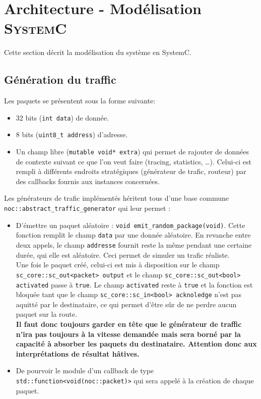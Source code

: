 \section{Architecture - Modélisation \textsc{SystemC}}

Cette section décrit la modélisation du système en SystemC.

\subsection{Génération du traffic}

Les paquets se présentent sous la forme suivante:
\begin{itemize}
  \item 32 bits (\texttt{int data}) de donnée.
  \item 8 bits (\texttt{uint8\_t address}) d'adresse.
  \item Un champ libre (\texttt{mutable void* extra}) qui permet de rajouter de
    données de contexte suivant ce que l'on veut faire (tracing, statistics,
    \ldots). Celui-ci est rempli à différents endroits stratégiques
    (générateur de trafic, routeur) par des callbacks fournis aux instances
    concernées.
\end{itemize}

\vspace{0.5cm}

Les générateurs de trafic implémentés héritent tous d'une base commune \\
\texttt{noc::abstract\_traffic\_generator} qui leur permet :
\begin{itemize}
  \item D'émettre un paquet aléatoire : \texttt{void
    emit\_random\_package(void)}. Cette fonction remplit le champ \texttt{data}
    par une donnée aléatoire. En revanche entre deux appels, le champ
    \texttt{addresse} fournit reste la même pendant une certaine durée, qui elle
    est aléatoire. Ceci permet de simuler un trafic réaliste. \\
    Une fois le paquet créé, celui-ci est mis à disposition sur le champ
    \texttt{sc\_core::sc\_out<packet> output} et le champ
    \texttt{sc\_core::sc\_out<bool> activated} passe à \texttt{true}. Le champ
    \texttt{activated} reste à \texttt{true} et la fonction est bloquée tant que le champ
    \texttt{sc\_core::sc\_in<bool> acknoledge} n'est pas aquitté par le
    destinataire, ce qui permet d'être sûr de ne perdre aucun paquet sur la
    route. \\
    \textbf{Il faut donc toujours garder en tête que le générateur de traffic
      n'ira pas toujours à la vitesse demandée mais sera borné par la capacité
      à absorber les paquets du destinataire. Attention donc aux interprétations
      de résultat hâtives.}
  \item De pourvoir le module d'un callback de type
    \texttt{std::function<void(noc::packet)>} qui sera appelé à la création de
    chaque paquet.
\end{itemize}

